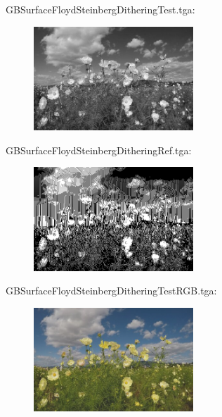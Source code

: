 GBSurfaceFloydSteinbergDitheringTest.tga:\\
\begin{center}
\begin{figure}[H]
\centering\includegraphics[width=6cm]{./GBSurfaceFloydSteinbergDitheringTest.png}\\
\end{figure}
\end{center}

GBSurfaceFloydSteinbergDitheringRef.tga:\\
\begin{center}
\begin{figure}[H]
\centering\includegraphics[width=6cm]{./GBSurfaceFloydSteinbergDitheringRef.png}\\
\end{figure}
\end{center}

GBSurfaceFloydSteinbergDitheringTestRGB.tga:\\
\begin{center}
\begin{figure}[H]
\centering\includegraphics[width=6cm]{./GBSurfaceFloydSteinbergDitheringTestRGB.png}\\
\end{figure}
\end{center}

